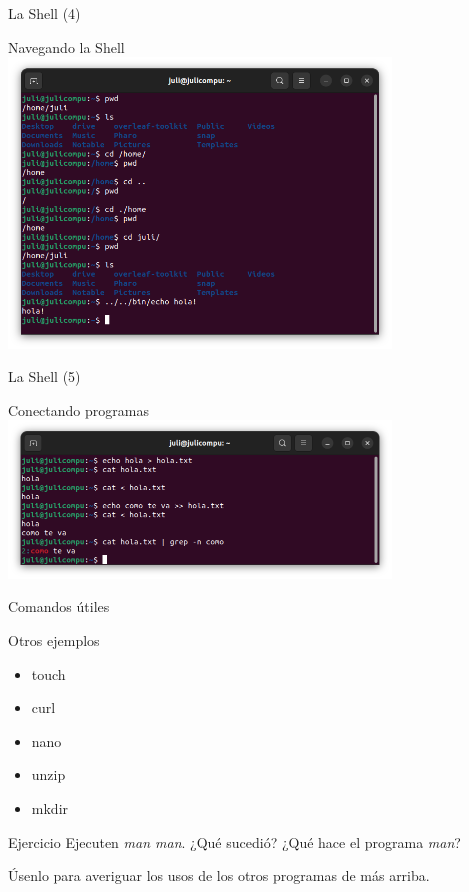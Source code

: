 \begin{frame}{La Shell (4)}
\begin{block}{Navegando la Shell}
        \vspace{-0.3cm}
        \centering
        \includegraphics[width=4in]{images/bash-3.png}
\end{block}
\end{frame}

\begin{frame}{La Shell (5)}
\begin{block}{Conectando programas}
        \centering
        \includegraphics[width=4in]{images/bash-4.png}
\end{block}
\end{frame}

\begin{frame}{Comandos útiles}

\begin{block} {Otros ejemplos}
        \begin{itemize}
        \item touch
        \item curl
        \item nano
        \item unzip
        \item mkdir
    \end{itemize}
\end{block}

    \begin{ejercicio}{Ejercicio}
        Ejecuten \textit{man man}. ¿Qué sucedió? ¿Qué hace el programa \textit{man}?

        Úsenlo para averiguar los usos de los otros programas de más arriba.

    \end{ejercicio}
    
\end{frame}

